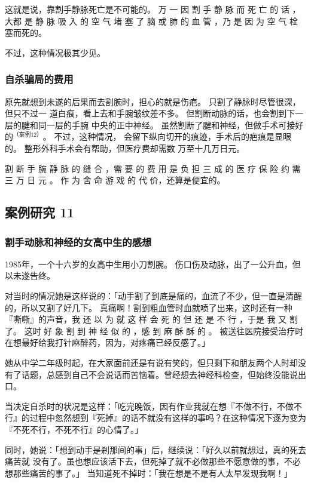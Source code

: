 \documentclass[UTF8]{ctexart}
\begin{document}
这就是说，靠割手静脉死亡是不可能的。 
万 一 因 割 手 静 脉 而 死 亡 的 话 ，大都 是 静 脉 吸 入 的 空 气 堵 塞 了 脑 或 肺 的 血 管 ，乃 是 因 为 空 气 栓 塞而死的。

不过，这种情况极其少见。 

\subsubsection*{自杀骗局的费用}

原先就想到未遂的后果而去割腕时，担心的就是伤疤。
只割了静脉时尽管很深，但只不过一 道白痕，看上去和手腕皱纹差不多。
但割断动脉的话，也会割到下一层的腱和同一层的手腕 中央的正中神经。
虽然割断了腱和神经，但做手术可接好的$^{（案例 12）}$。
不过，这种情况， 会留下纵向切开的痕迹，手术后的疤痕是显眼的。
整形外科手术会有帮助，但医疗费却需数 万至十几万日元。

割 断 手 腕 静 脉 的 缝 合 ，需 要 的 费 用 是 负 担 三 成 的 医 疗 保 险 约 需 三 万 日 元 。
作 为 舍 命 游 戏 的 代 价，还算是便宜的。

\subsection{案例研究 11}
\subsubsection*{割手动脉和神经的女高中生的感想}

1985年，一个十六岁的女高中生用小刀割腕。
伤口伤及动脉，出了一公升血，但以未遂告终。

对当时的情况她是这样说的：「动手割了到底是痛的，血流了不少，但一直是清醒的，所以又割了好几下。
真痛啊！割到粗血管时血就喷了出来，这时还有一种『嘶嘶』的声音，我 还 以 为 就 这 样 会 死 的 但 还 是 不 行 ，于是 我 又 割 了。
这时 好 象 割 到 神 经 似 的 ，感 到 麻 酥 酥 的 。 
被送往医院接受治疗时在想最好给我打针麻醉药，因为，对疼痛已经反感了。」

她从中学二年级时起，在大家面前还是有说有笑的，但只剩下和朋友两个人时却没有了话题，总感到自己不会说话而苦恼着。曾经想去神经科检查，但始终没能说出口。

当决定自杀时的状况是这样：「吃完晚饭，因有作业我就在想『不做不行，不做不行』的过程中忽然想到『死掉』的话不就没有这样的事吗？在这种情况下逐为变为『不死不行，不死不行』的心情了。」

同时，她说：「想到动手是剎那间的事」后，继续说：「好久以前就想过，真的死去痛苦就 没有了。虽也想应该活下去，但死掉了就不必做那些不愿意做的事，不必想那些痛苦的事了。」 当知道死不掉时：「我在想是不是有人太早发现我啊！」
\end{document}
